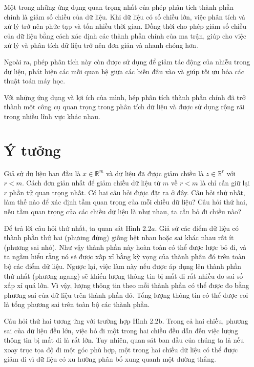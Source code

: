 \documentclass[12pt,a4paper,oneside]{report}
\numberwithin{equation}{section}
\begin{document}
Một trong những ứng dụng quan trọng nhất của phép phân tích thành phần chính là giảm số chiều của dữ liệu. Khi dữ liệu có số chiều lớn, việc phân tích và xử lý trở nên phức tạp và tốn nhiều thời gian. Đồng thời cho phép giảm số chiều của dữ liệu bằng cách xác định các thành phần chính của ma trận, giúp cho việc xử lý và phân tích dữ liệu trở nên đơn giản và nhanh chóng hơn.

Ngoài ra, phép phân tích này còn được sử dụng để giảm tác động của nhiễu trong dữ liệu, phát hiện các mối quan hệ giữa các biến đầu vào và giúp tối ưu hóa các thuật toán máy học.

Với những ứng dụng và lợi ích của mình, hép phân tích thành phần chính đã trở thành một công cụ quan trọng trong phân tích dữ liệu và được sử dụng rộng rãi trong nhiều lĩnh vực khác nhau.
\section{Ý tưởng}
Giả sử dữ liệu ban đầu là $x \in \mathbb{R}^{m}$ và dữ liệu đã được giảm chiều là $z \in \mathbb{R}^{r}$ với $r<m$. Cách đơn giản nhất để giảm chiều dữ liệu từ $m$ về $r<m$ là chỉ cần giữ lại $r$ phần tử quan trọng nhất. Có hai câu hỏi được đặt ra ở đây. Câu hỏi thứ nhất, làm thế nào để xác định tầm quan trọng của mỗi chiều dữ liệu? Câu hỏi thứ hai, nếu tầm quan trọng của các chiều dữ liệu là như nhau, ta cần bỏ đi chiều nào?

Để trả lời câu hỏi thứ nhất, ta quan sát Hình $2.2 a$. Giả sử các điểm dữ liệu có thành phần thứ hai (phương đứng) giống hệt nhau hoặc sai khác nhau rất ít (phương sai nhỏ). Như vậy thành phần này hoàn toàn có thể được lược bỏ đi, và ta ngầm hiểu rằng nó sẽ được xấp xỉ bằng kỳ vọng của thành phần đó trên toàn bộ các điểm dữ liệu. Ngược lại, việc làm này nếu được áp dụng lên thành phần thứ nhất (phương ngang) sẽ khiến lượng thông tin bị mất đi rất nhiều do sai số xấp xỉ quá lớn. Vì vậy, lượng thông tin theo mỗi thành phần có thể được đo bằng phương sai của dữ liệu trên thành phần đó. Tổng lượng thông tin có thể được coi là tổng phương sai trên toàn bộ các thành phần.

Câu hỏi thứ hai tương ứng với trường hợp Hình 2.2b. Trong cả hai chiều, phương sai của dữ liệu đều lớn, việc bỏ đi một trong hai chiều đều dẫn đến việc lượng thông tin bị mất đi là rất lớn. Tuy nhiên, quan sát ban đầu của chúng ta là nếu xoay trục tọa độ đi một góc phù hợp, một trong hai chiều dữ liệu có thể được giảm đi vì dữ liệu có xu hướng phân bố xung quanh một đường thẳng.
\end{document}
